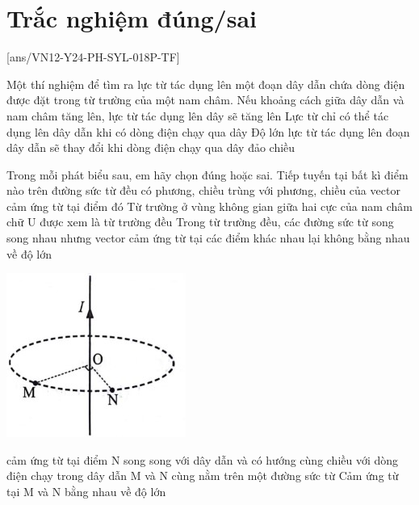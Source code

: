 \section{Trắc nghiệm đúng/sai}
[ans/VN12-Y24-PH-SYL-018P-TF]
\setcounter{ex}{0}
\begin{ex}
	Một thí nghiệm để tìm ra lực từ tác dụng lên một đoạn dây dẫn chứa dòng điện được đặt trong từ trường của một nam châm.
	{Nếu khoảng cách giữa dây dẫn và nam châm tăng lên, lực từ tác dụng lên dây sẽ tăng lên}
	{\True Lực từ chỉ có thể tác dụng lên dây dẫn khi có dòng điện chạy qua dây}
	{Độ lớn lực từ tác dụng lên đoạn dây dẫn sẽ thay đổi khi dòng điện chạy qua dây đảo chiều}
	\loigiai{}
\end{ex}
\begin{ex}
	Trong mỗi phát biểu sau, em hãy chọn đúng hoặc sai.	
	{\True Tiếp tuyến tại bất kì điểm nào trên đường sức từ đều có phương, chiều trùng với phương, chiều của vector cảm ứng từ tại điểm đó}
	{\True Từ trường ở vùng không gian giữa hai cực của nam châm chữ U được xem là từ trường đều}
	{Trong từ trường đều, các đường sức từ song song nhau nhưng vector cảm ứng từ tại các điểm khác nhau lại không bằng nhau về độ lớn}
	\loigiai{}
\end{ex}
\begin{ex}
{		\includegraphics[width=0.4\linewidth]{../figs/VN12-Y24-PH-SYL-018P-1}
}

	{cảm ứng từ tại điểm N song song với dây dẫn và có hướng cùng chiều với dòng điện chạy trong dây dẫn}
	{\True M và N cùng nằm trên một đường sức từ}
	{\True Cảm ứng từ tại M và N bằng nhau về độ lớn}
	\loigiai{}
\end{ex}

